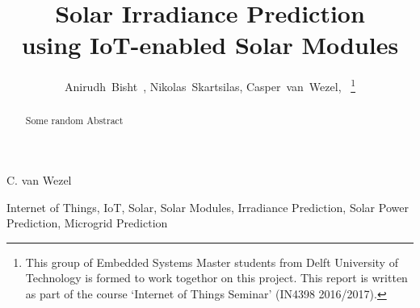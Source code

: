 \documentclass[a4paper,journal]{DDREAM}
\begin{document}
%
\title{\vspace*{0.0cm} Solar Irradiance Prediction \\ using IoT-enabled Solar Modules}
%
%
\author{\vspace*{0.0cm}Anirudh~Bisht~,
Nikolas~Skartsilas,
Casper~van~Wezel,~%
\thanks{\footnotesize{This group of Embedded Systems Master students from Delft University of Technology is formed to work togethor on this project. This report is written as part of the course `Internet of Things Seminar' (IN4398 2016/2017).}}%
}

%
{C. van Wezel}%
\maketitle


\begin{abstract}
Some random Abstract
\end{abstract}

\begin{IEEEkeywords}
Internet of Things, IoT, Solar, Solar Modules, Irradiance Prediction, Solar Power Prediction, Microgrid Prediction
\end{IEEEkeywords}
\end{document}

